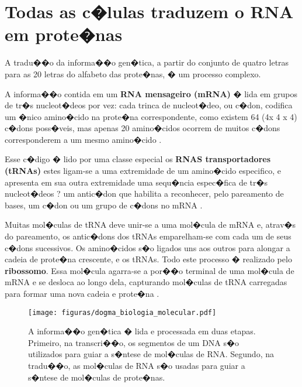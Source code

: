 \section{Todas as c�lulas traduzem o RNA em prote�nas}

A tradu��o da informa��o gen�tica, a partir do conjunto de quatro letras para as 20 letras do alfabeto das prote�nas, � um processo complexo.

A informa��o contida em um \textbf{RNA mensageiro (mRNA)} � lida em grupos de tr�s nucleot�deos por vez: cada trinca de nucleot�deo, ou c�don, codifica um �nico amino�cido na prote�na correspondente, como existem 64 (4x 4 x 4) c�dons poss�veis, mas apenas 20 amino�cidos ocorrem de muitos c�dons corresponderem a um mesmo amino�cido \cite{Alberts}.

Esse c�digo � lido por uma classe especial os \textbf{RNAS transportadores (tRNAs)} estes ligam-se a uma extremidade de um amino�cido especifico, e apresenta em sua outra extremidade uma sequ�ncia espec�fica de tr�s nucleot�deos ? um antic�don que habilita a reconhecer, pelo pareamento de bases, um c�don ou um grupo de c�dons no mRNA \cite{Alberts}.

Muitas mol�culas de tRNA deve unir-se a uma mol�cula de mRNA e, atrav�s do pareamento, os antic�dons dos tRNAs emparelham-se com cada um de seus c�dons sucessivos. Os amino�cidos s�o ligados uns aos outros para alongar a cadeia de prote�na crescente, e os tRNAs. Todo este processo � realizado pelo \textbf{ribossomo}. Essa mol�cula agarra-se a por��o terminal de uma mol�cula de mRNA e se desloca ao longo dela, capturando mol�culas de tRNA carregadas para formar uma nova cadeia e prote�na \cite{Alberts}.

\begin{figure}[!h]
\centering
\texttt{[image: figuras/dogma\_biologia\_molecular.pdf]}
\caption{A informa��o gen�tica � lida e processada em duas etapas. Primeiro, na transcri��o, os segmentos de um DNA s�o utilizados para guiar a s�ntese de mol�culas de RNA. Segundo, na tradu��o, as mol�culas de RNA s�o usadas para guiar a s�ntese de mol�culas de prote�nas.
}
\label{fig:dogma_biologia_molecular}
\end{figure}

